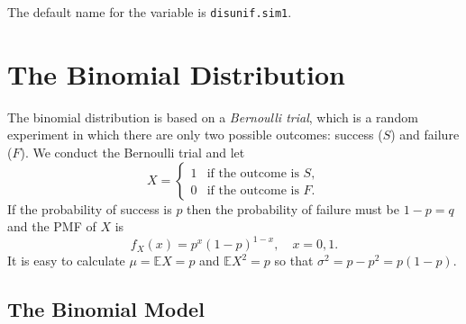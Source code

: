 \documentclass[captions=tableheading]{scrbook}
\begin{document}
The default name for the variable is \texttt{disunif.sim1}.
\section{The Binomial Distribution}
\label{sec-5-3}
\label{sec-binom-dist}


The binomial distribution is based on a \emph{Bernoulli trial}, which is a random experiment in which there are only two possible outcomes: success (\(S\)) and failure (\(F\)). We conduct the Bernoulli trial and let 
\begin{equation}
X=
\begin{cases}
1 & \mbox{if the outcome is $S$},\\
0 & \mbox{if the outcome is $F$}.
\end{cases}
\end{equation}
If the probability of success is \(p\) then the probability of failure must be \(1-p=q\) and the PMF of \(X\) is
\begin{equation}
f_{X}(x)=p^{x}(1-p)^{1-x},\quad x=0,1.
\end{equation}
It is easy to calculate \(\mu=\mathbb{E} X=p\) and \(\mathbb{E} X^{2}=p\) so that \(\sigma^{2}=p-p^{2}=p(1-p)\).
\subsection{The Binomial Model}
\label{sec-5-3-1}
\label{sub-The-Binomial-Model}
\end{document}
